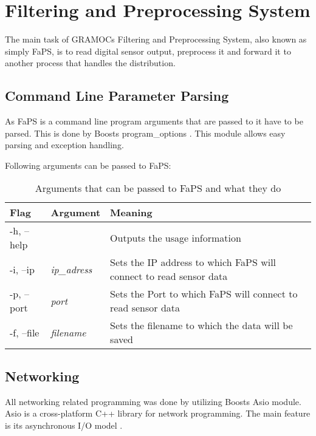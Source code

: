 \chapter{Filtering and Preprocessing System}
\label{ch:faps}

The main task of GRAMOCs Filtering and Preprocessing System, also known as simply FaPS, is to read digital sensor output, preprocess it and forward it to another process that handles the distribution.

\section{Command Line Parameter Parsing}

As FaPS is a command line program arguments that are passed to it have to be parsed. This is done by Boosts program\_options \cite{BoostProgramOptions}. This module allows easy parsing and exception handling.

Following arguments can be passed to FaPS:

\begin{table}[H]
    \centering
    \begin{tabular}{| l | l | p{5cm} |}
    \hline
    \textbf{Flag} & \textbf{Argument} & \textbf{Meaning} \\ \hline
    -h, --help & & Outputs the usage information \\ \hline
    -i, --ip & \textit{ip\_adress} & Sets the IP address to which FaPS will connect to read sensor data \\ \hline
    -p, --port & \textit{port} & Sets the Port to which FaPS will connect to read sensor data \\ \hline
    -f, --file & \textit{filename} & Sets the filename to which the data will be saved \\
    \hline
    \end{tabular}
    \caption{Arguments that can be passed to FaPS and what they do}
    \label{tab:faps_arguments}
\end{table}

\section{Networking}

All networking related programming was done by utilizing Boosts Asio module. Asio is a cross-platform C++ library for network programming. The main feature is its asynchronous I/O model \cite{BoostAsio}.

